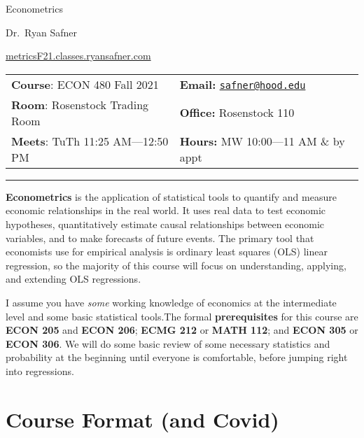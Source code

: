 \documentclass{article}
\begin{document}
\sffamily

\centerline{\Huge Econometrics}

\vspace{3 mm}

\centerline{\large Dr.~Ryan Safner}
\vspace{2 mm}
\centerline{\large \href{http://metricsF21.classes.ryansafner.com}{metricsF21.classes.ryansafner.com}}

\vspace{5 mm}

\begin{tabular}{@{}p{3.5in}p{3.5in}}           
\textbf{Course}: ECON 480 Fall
2021  & \textbf{Email:}  \href{mailto:safner@hood.edu}{\nolinkurl{safner@hood.edu}}\\
\textbf{Room}: Rosenstock Trading Room & \textbf{Office:}  Rosenstock
110\\
\textbf{Meets}: TuTh 11:25 AM---12:50 PM & \textbf{Hours:}  MW
10:00---11 AM \& by appt\\ 
\end{tabular}

\vspace{5 mm}

\hrule


\textbf{Econometrics} is the application of statistical tools to
quantify and measure economic relationships in the real world. It uses
real data to test economic hypotheses, quantitatively estimate causal
relationships between economic variables, and to make forecasts of
future events. The primary tool that economists use for empirical
analysis is ordinary least squares (OLS) linear regression, so the
majority of this course will focus on understanding, applying, and
extending OLS regressions.

I assume you have \emph{some} working knowledge of economics at the
intermediate level and some basic statistical tools.The formal
\textbf{prerequisites} for this course are \textbf{ECON 205} and
\textbf{ECON 206}; \textbf{ECMG 212} or \textbf{MATH 112}; and
\textbf{ECON 305} or \textbf{ECON 306}. We will do some basic review of
some necessary statistics and probability at the beginning until
everyone is comfortable, before jumping right into regressions.

\hypertarget{course-format-and-covid}{%
\section{Course Format (and Covid)}\label{course-format-and-covid}}
\end{document}
